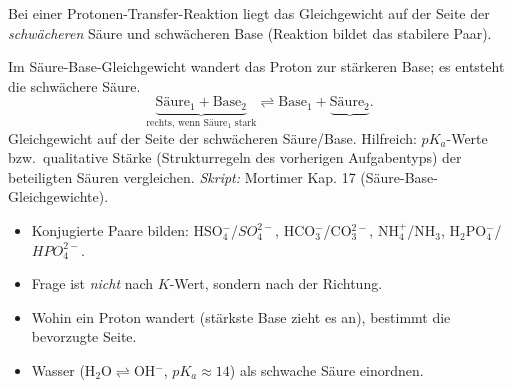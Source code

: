 

Bei einer Protonen-Transfer-Reaktion liegt das Gleichgewicht auf der Seite
der \emph{schwächeren} Säure und schwächeren Base (Reaktion bildet das
stabilere Paar).

\begin{werkzeugkasten}[Gleichgewichtslage]
Im Säure-Base-Gleichgewicht wandert das Proton zur stärkeren Base; es
entsteht die schwächere Säure.
\[
  \underbrace{\text{Säure$_1$} + \text{Base$_2$}}_{\text{rechts, wenn
  Säure$_1$ stark}} \rightleftharpoons
  \text{Base$_1$} + \underbrace{\text{Säure$_2$}} .
\]
Gleichgewicht auf der Seite der schwächeren Säure/Base.
Hilfreich: $pK_a$-Werte bzw.\ qualitative Stärke (Strukturregeln des
vorherigen Aufgabentyps) der beteiligten Säuren vergleichen.
\textit{Skript:} Mortimer Kap. 17 (Säure-Base-Gleichgewichte).
\end{werkzeugkasten}

\begin{achtung}
\begin{itemize}
  \item Konjugierte Paare bilden: HSO$_4^-$/$SO_4^{2-}$,
        HCO$_3^-$/CO$_3^{2-}$, NH$_4^+$/NH$_3$, H$_2$PO$_4^-$/$HPO_4^{2-}$.
  \item Frage ist \emph{nicht} nach $K$-Wert, sondern nach der Richtung.
  \item Wohin ein Proton wandert (stärkste Base zieht es an), bestimmt die
        bevorzugte Seite.
  \item Wasser (H$_2$O$\rightleftharpoons$OH$^-$, $pK_a\approx14$) als
        schwache Säure einordnen.
\end{itemize}
\end{achtung}
